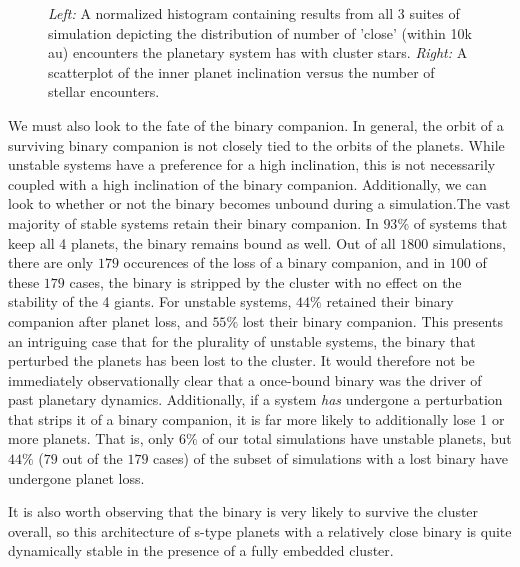 \documentclass{aastex631}
\begin{document}
\begin{figure}
    \caption{\textit{Left: }A normalized histogram containing results from all 3 suites of simulation depicting the distribution of 
    number of 'close' (within 10k au) encounters the planetary system has with cluster stars. \textit{Right: }A scatterplot of the inner planet inclination
    versus the number of stellar encounters.}
    \label{fig:close_hist}
\end{figure}
We must also look to the fate of the binary companion. In general, the orbit of a surviving binary companion is not 
closely tied to the orbits of the planets. 
While unstable systems have a preference 
for a high inclination, this is not necessarily coupled with a high inclination of the binary companion. Additionally, we can look to whether or not the binary 
becomes unbound during a simulation.The vast majority of stable systems 
retain their binary companion. In $93\%$ of systems that keep all 4 planets, the binary remains bound as well.  
Out of all $1800$ simulations, there are only $179$ occurences of the loss of a binary companion, and in $100$ of these $179$ cases,
the binary is stripped by the cluster with no effect on the stability of the 4 giants. 
For unstable systems, $44\%$ retained their binary companion after planet loss, and $55\%$ lost their binary companion. This presents an intriguing
case that for the plurality of unstable systems, the binary that perturbed the planets has been lost to the cluster. It would therefore not be 
immediately observationally clear that a once-bound binary was the driver of past planetary dynamics. Additionally, if a system \textit{has} undergone
a perturbation that strips it of a binary companion, it is far more likely to additionally lose 1 or more planets. That is, only $6\%$ of our total 
simulations have unstable planets, but $44\%$ ($79$ out of the $179$ cases) of the subset of simulations with a lost binary have undergone planet loss.


It is also worth observing that the binary is very likely to survive the cluster overall, so this
architecture of s-type planets with a relatively close binary is quite dynamically stable in the presence of a fully embedded cluster.  
\end{document}
